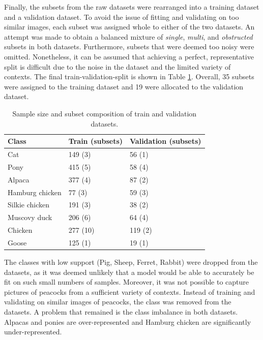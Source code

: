 \documentclass{l4proj}
\begin{document}
Finally, the subsets from the raw datasets were rearranged into a training dataset and a validation dataset. To avoid the issue of fitting and validating on too similar images, each subset was assigned whole to either of the two datasets. An attempt was made to obtain a balanced mixture of \textit{single}, \textit{multi}, and \textit{obstructed} subsets in both datasets. Furthermore, subsets that were deemed too noisy were omitted. Nonetheless, it can be assumed that achieving a perfect, representative split is difficult due to the noise in the dataset and the limited variety of contexts. The final train-validation-split is shown in Table \ref{table:train_test_dataset}. Overall, 35 subsets were assigned to the training dataset and 19 were allocated to the validation dataset.

\begin{table}[ht]
  \centering
  \begin{tabular}{@{}lll@{}}
    \toprule
    \textbf{Class}  & \textbf{Train (subsets)} & \textbf{Validation (subsets)} \\ \midrule
    Cat             & 149 (3)                  & 56  (1)        \\
    Pony            & 415 (5)                  & 58  (4)        \\
    Alpaca          & 377 (4)                  & 87  (2)        \\
    Hamburg chicken & 77  (3)                  & 59  (3)        \\
    Silkie chicken  & 191 (3)                  & 38  (2)        \\
    Muscovy duck    & 206 (6)                  & 64  (4)        \\
    Chicken         & 277 (10)                 & 119 (2)        \\
    Goose           & 125 (1)                  & 19  (1)        \\ \bottomrule
  \end{tabular}
  \caption{Sample size and subset composition of train and validation datasets.}
  \label{table:train_test_dataset}
\end{table}

The classes with low support (Pig, Sheep, Ferret, Rabbit) were dropped from the datasets, as it was deemed unlikely that a model would be able to accurately be fit on such small numbers of samples. Moreover, it was not possible to capture pictures of peacocks from a sufficient variety of contexts. Instead of training and validating on similar images of peacocks, the class was removed from the datasets. A problem that remained is the class imbalance in both datasets. Alpacas and ponies are over-represented and Hamburg chicken are significantly under-represented.
\end{document}
